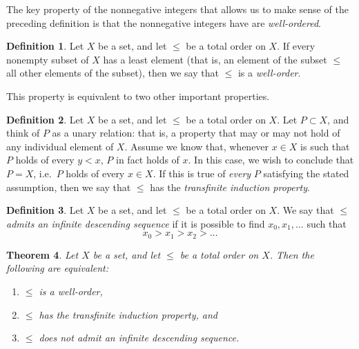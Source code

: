 \documentclass[letterpaper]{article}
\newtheorem{theorem}{Theorem}[section]
\theoremstyle{definition}
\newtheorem{definition}[theorem]{Definition}
\begin{document}
The key property of the nonnegative integers that allows us to make
sense of the preceding definition is that the nonnegative integers
have are \emph{well-ordered}.
\begin{definition}
  Let \(X\) be a set, and let \(\leq\) be a total order on \(X\).  If
  every nonempty subset of \(X\) has a least element (that is, an
  element of the subset \(\leq\) all other elements of the subset),
  then we say that \(\leq\) is a \emph{well-order}.
\end{definition}

This property is equivalent to two other important properties.
\begin{definition}
  Let \(X\) be a set, and let \(\leq\) be a total order on \(X\).  Let
  \(P \subset X\), and think of \(P\) as a unary relation: that is, a
  property that may or may not hold of any individual element of
  \(X\).  Assume we know that, whenever \(x \in X\) is such that \(P\)
  holds of every \(y < x\), \(P\) in fact holds of \(x\).  In this
  case, we wish to conclude that \(P = X\), i.e.\ \(P\) holds of every
  \(x \in X\).  If this is true of \emph{every} \(P\) satisfying the
  stated assumption, then we say that \(\leq\) has the
  \emph{transfinite induction property}.
\end{definition}
\begin{definition}
  Let \(X\) be a set, and let \(\leq\) be a total order on \(X\).  We
  say that \(\leq\) \emph{admits an infinite descending sequence} if
  it is possible to find \(x_0, x_1, \ldots\) such that
  \[x_0 > x_1 > x_2 > \ldots\]
\end{definition}
\begin{theorem}
  Let \(X\) be a set, and let \(\leq\) be a total order on \(X\).
  Then the following are equivalent:
  \begin{enumerate}
    \item \(\leq\) is a well-order,
    \item \(\leq\) has the transfinite induction property, and
    \item \(\leq\) does not admit an infinite descending sequence.
  \end{enumerate}
\end{theorem}
\end{document}
